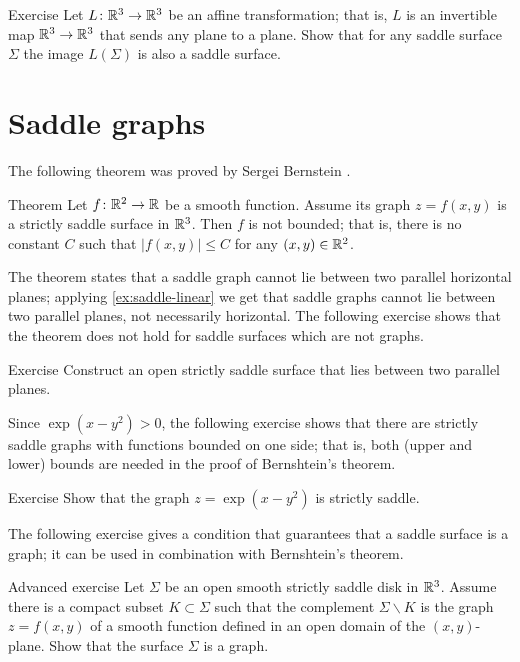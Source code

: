 \begin{thm}{Exercise}\label{ex:saddle-linear}
Let $L\colon\mathbb{R}^3\to\mathbb{R}^3$ be an affine transformation; that is, $L$ is an invertible map $\mathbb{R}^3\to\mathbb{R}^3$ that sends any plane to a plane. 
Show that for any saddle surface $\Sigma$ the image $L(\Sigma)$ is also a saddle surface.
\end{thm}


\section{Saddle graphs}

The following theorem was proved by Sergei Bernstein \cite{bernstein}.

\begin{thm}{Theorem}\label{thm:bernshtein}
Let $f\colon\mathbb{R}^2\to\mathbb{R}$ be a smooth function.
Assume its graph $z=f(x,y)$ is a strictly saddle surface in $\mathbb{R}^3$.
Then $f$ is not bounded;
that is, there is no constant $C$ such that 
$|f(x,y)|\le C$ for any $(x,y)\in\mathbb{R}^2$.
\end{thm}

The theorem states that a saddle graph cannot lie between two parallel horizontal planes;
applying \ref{ex:saddle-linear} we get that saddle graphs cannot lie between two parallel planes,
not necessarily horizontal.
The following exercise shows that the theorem does not hold for saddle surfaces which are not graphs.


\begin{thm}{Exercise}\label{ex:between-parallels}
Construct an open strictly saddle surface that lies between two parallel planes.
\end{thm}

Since $\exp(x-y^2)>0$,
the following exercise shows that there are strictly saddle graphs with functions bounded on one side; that is, both (upper and lower) bounds are needed in the proof of Bernshtein's theorem.

\begin{thm}{Exercise}\label{ex:one-side-bernshtein}
Show that the graph
$z=\exp(x-y^2)$
is strictly saddle.
\end{thm}

The following exercise gives a condition that guarantees that a saddle surface is a graph;
it can be used in combination with Bernshtein's theorem.

\begin{thm}{Advanced exercise}\label{ex:saddle-graph}
Let $\Sigma$ be an open smooth strictly saddle disk in $\mathbb{R}^3$.
Assume there is a compact subset $K\subset \Sigma$ such that the complement $\Sigma\backslash K$ is the graph $z=f(x,y)$ of a smooth function defined in an open domain of the $(x,y)$-plane.
Show that the surface $\Sigma$ is a graph.
\end{thm}

